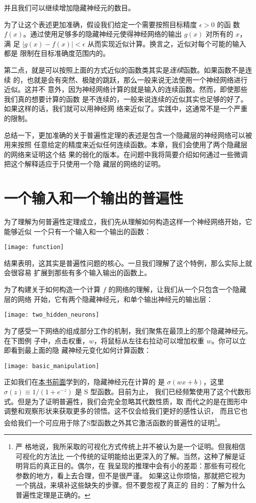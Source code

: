 并且我们可以继续增加隐藏神经元的数目。

为了让这个表述更加准确，假设我们给定一个需要按照目标精度 $\epsilon > 0$ 的函
数 $f(x)$。通过使用足够多的隐藏神经元使得神经网络的输出 $g(x)$ 对所有的 $x$，满
足 $|g(x) - f(x)| < \epsilon$ 从而实现近似计算。换言之，近似对每个可能的输入都是
限制在目标准确度范围内的。

第二点，就是可以按照上面的方式近似的函数类其实是\emph{连续}函数。如果函数不是连续
的，也就是会有突然、极陡的跳跃，那么一般来说无法使用一个神经网络进行近似。这并不
意外，因为神经网络计算的就是输入的连续函数。然而，即使那些我们真的想要计算的函数
是不连续的，一般来说连续的近似其实也足够的好了。如果这样的话，我们就可以用神经网
络来近似了。实践中，这通常不是一个严重的限制。

总结一下，更加准确的关于普遍性定理的表述是包含一个隐藏层的神经网络可以被用来按照
任意给定的精度来近似任何连续函数。本章，我们会使用了两个隐藏层的网络来证明这个结
果的弱化的版本。在问题中我将简要介绍如何通过一些微调把这个解释适应于只使用一个隐
藏层的网络的证明。

\section{一个输入和一个输出的普遍性}
\label{sec:universality_with_one_input_and_one_output}

为了理解为何普遍性定理成立，我们先从理解如何构造这样一个神经网络开始，它能够近似
一个只有一个输入和一个输出的函数：
\begin{center}
  \texttt{[image: function]}
\end{center}

结果表明，这其实是普遍性问题的核心。一旦我们理解了这个特例，那么实际上就会很容易
扩展到那些有多个输入输出的函数上。

为了构建关于如何构造一个计算 $f$ 的网络的理解，让我们从一个只包含一个隐藏层的网络
开始，它有两个隐藏神经元，和单个输出神经元的输出层：
\begin{center}
  \texttt{[image: two\_hidden\_neurons]}
\end{center}

为了感受一下网络的组成部分工作的机制，我们聚焦在最顶上的那个隐藏神经元。在下图例
子中，点击权重，$w$，将鼠标从左往右拉动可以增加权重 $w$。你可以立即看到最上面的隐
藏神经元变化如何计算函数：
\begin{center}
  \texttt{[image: basic\_manipulation]}
\end{center}

正如我们在\hyperref[sec:sigmoid_neurons]{本书前面}学到的，隐藏神经元在计算的
是 $\sigma(wx + b)$，这里 $\sigma(z) \equiv 1/(1+e^{-z})$ 是 S 型函数。目前为止，
我们已经频繁使用了这个代数形式。但是为了证明普遍性，我们会完全忽略其代数性质，取
而代之的是在图形中调整和观察形状来获取更多的领悟。这不仅会给我们更好的感性认识，
而且它也会给我们一个可应用于除了S型函数之外其它激活函数的普遍性的证明\footnote{严
  格地说，我所采取的可视化方式传统上并不被认为是一个证明。但我相信可视化的方法比
  一个传统的证明能给出更深入的了解。当然，这种了解是证明背后的真正目的。偶尔，在
  我呈现的推理中会有小的差距：那些有可视化参数的地方，看上去合理，但不是很严谨。
  如果这让你烦恼，那就把它视为一个挑战，来填补这些缺失的步骤。但不要忽视了真正的
  目的：了解为什么普遍性定理是正确的。}。

